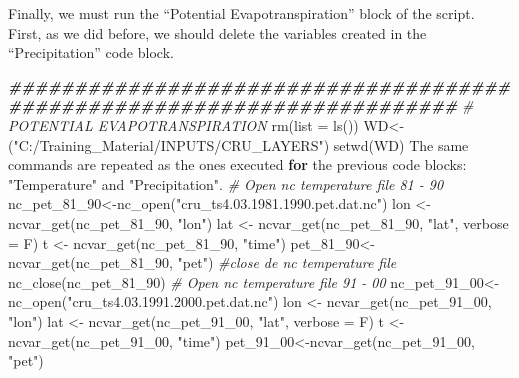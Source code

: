 \documentclass[
  10pt,
  b5paper,
]{book}
\newenvironment{Shaded}{\begin{snugshade}}{\end{snugshade}}
\newcommand{\AttributeTok}[1]{\textcolor[rgb]{0.77,0.63,0.00}{#1}}
\newcommand{\CommentTok}[1]{\textcolor[rgb]{0.56,0.35,0.01}{\textit{#1}}}
\newcommand{\ControlFlowTok}[1]{\textcolor[rgb]{0.13,0.29,0.53}{\textbf{#1}}}
\newcommand{\DocumentationTok}[1]{\textcolor[rgb]{0.56,0.35,0.01}{\textbf{\textit{#1}}}}
\newcommand{\FunctionTok}[1]{\textcolor[rgb]{0.00,0.00,0.00}{#1}}
\newcommand{\NormalTok}[1]{#1}
\newcommand{\OtherTok}[1]{\textcolor[rgb]{0.56,0.35,0.01}{#1}}
\newcommand{\SpecialCharTok}[1]{\textcolor[rgb]{0.00,0.00,0.00}{#1}}
\newcommand{\StringTok}[1]{\textcolor[rgb]{0.31,0.60,0.02}{#1}}
\begin{document}
Finally, we must run the ``Potential Evapotranspiration'' block of the script. First, as we did before, we should delete the variables created in the ``Precipitation'' code block.

\begin{Shaded}
\begin{Highlighting}[]
\DocumentationTok{\#\#\#\#\#\#\#\#\#\#\#\#\#\#\#\#\#\#\#\#\#\#\#\#\#\#\#\#\#\#\#\#\#\#\#\#\#\#\#\#\#\#\#\#\#\#\#\#\#\#\#\#\#\#\#\#\#\#\#\#\#\#\#\#\#\#\#\#\#\#\#\#}
\CommentTok{\# POTENTIAL EVAPOTRANSPIRATION }
 \FunctionTok{rm}\NormalTok{(}\AttributeTok{list =} \FunctionTok{ls}\NormalTok{())}
\NormalTok{WD}\OtherTok{\textless{}{-}}\NormalTok{(}\StringTok{"C:/Training\_Material/INPUTS/CRU\_LAYERS"}\NormalTok{)}
\FunctionTok{setwd}\NormalTok{(WD)}
\NormalTok{The same commands are repeated as the ones executed }\ControlFlowTok{for}\NormalTok{ the previous code blocks}\SpecialCharTok{:} \StringTok{"Temperature"}\NormalTok{ and }\StringTok{"Precipitation"}\NormalTok{. }
\CommentTok{\# Open nc temperature file 81 {-} 90}
\NormalTok{nc\_pet\_81\_90}\OtherTok{\textless{}{-}}\FunctionTok{nc\_open}\NormalTok{(}\StringTok{"cru\_ts4.03.1981.1990.pet.dat.nc"}\NormalTok{)}
\NormalTok{ lon }\OtherTok{\textless{}{-}} \FunctionTok{ncvar\_get}\NormalTok{(nc\_pet\_81\_90, }\StringTok{"lon"}\NormalTok{)}
\NormalTok{lat }\OtherTok{\textless{}{-}} \FunctionTok{ncvar\_get}\NormalTok{(nc\_pet\_81\_90, }\StringTok{"lat"}\NormalTok{, }\AttributeTok{verbose =}\NormalTok{ F)}
\NormalTok{t }\OtherTok{\textless{}{-}} \FunctionTok{ncvar\_get}\NormalTok{(nc\_pet\_81\_90, }\StringTok{"time"}\NormalTok{)}
\NormalTok{ pet\_81\_90}\OtherTok{\textless{}{-}}\FunctionTok{ncvar\_get}\NormalTok{(nc\_pet\_81\_90, }\StringTok{"pet"}\NormalTok{)}
 \CommentTok{\#close de nc temperature file}
 \FunctionTok{nc\_close}\NormalTok{(nc\_pet\_81\_90) }
 \CommentTok{\# Open nc temperature file 91 {-} 00}
\NormalTok{ nc\_pet\_91\_00}\OtherTok{\textless{}{-}}\FunctionTok{nc\_open}\NormalTok{(}\StringTok{"cru\_ts4.03.1991.2000.pet.dat.nc"}\NormalTok{)}
\NormalTok{ lon }\OtherTok{\textless{}{-}} \FunctionTok{ncvar\_get}\NormalTok{(nc\_pet\_91\_00, }\StringTok{"lon"}\NormalTok{)}
\NormalTok{lat }\OtherTok{\textless{}{-}} \FunctionTok{ncvar\_get}\NormalTok{(nc\_pet\_91\_00, }\StringTok{"lat"}\NormalTok{, }\AttributeTok{verbose =}\NormalTok{ F)}
\NormalTok{t }\OtherTok{\textless{}{-}} \FunctionTok{ncvar\_get}\NormalTok{(nc\_pet\_91\_00, }\StringTok{"time"}\NormalTok{)}
\NormalTok{ pet\_91\_00}\OtherTok{\textless{}{-}}\FunctionTok{ncvar\_get}\NormalTok{(nc\_pet\_91\_00, }\StringTok{"pet"}\NormalTok{)}

\end{Highlighting}
\end{Shaded}
\end{document}
